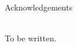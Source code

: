 \begin{Huge}
Acknowledgements
\end{Huge}\\[1cm]
\noindent
To be written.
\newpage
\null
\thispagestyle{empty}